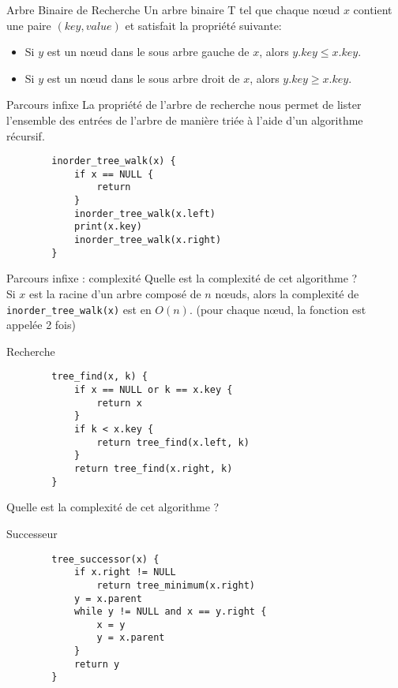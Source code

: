 \documentclass{beamer}
\begin{document}
\begin{frame}[t]{Arbre Binaire de Recherche}
Un arbre binaire T tel que chaque nœud $x$ contient une paire $(key, value)$ et satisfait la
propriété suivante:
\begin{itemize}
    \item Si $y$ est un nœud dans le sous arbre gauche de $x$, alors $y.key \leqslant x.key$.
    \item Si $y$ est un nœud dans le sous arbre droit de $x$, alors $y.key \geqslant x.key$.
\end{itemize}
\end{frame}

\begin{frame}[fragile]{Parcours infixe}
La propriété de l'arbre de recherche nous permet de lister l'ensemble des entrées de l'arbre de
manière triée à l'aide d'un algorithme récursif.
\pause
\begin{lstlisting}
        inorder_tree_walk(x) {
            if x == NULL {
                return
            }
            inorder_tree_walk(x.left)
            print(x.key)
            inorder_tree_walk(x.right)
        }
\end{lstlisting}
\end{frame}

\begin{frame}[fragile]{Parcours infixe : complexité}
    Quelle est la complexité de cet algorithme ?\\
    \pause
    \vfill
    Si $x$ est la racine d'un arbre composé de $n$ nœuds, alors la complexité de
    \texttt{inorder\_tree\_walk(x)} est en $O(n)$. (pour chaque nœud, la fonction est appelée 2 fois)
\end{frame}


\begin{frame}[fragile]{Recherche}
    \pause
    \begin{lstlisting}
        tree_find(x, k) {
            if x == NULL or k == x.key {
                return x
            }
            if k < x.key {
                return tree_find(x.left, k)
            }
            return tree_find(x.right, k)
        }
    \end{lstlisting}

    Quelle est la complexité de cet algorithme ?
\end{frame}

\begin{frame}[fragile]{Successeur}
    \pause
    \begin{lstlisting}
        tree_successor(x) {
            if x.right != NULL
                return tree_minimum(x.right)
            y = x.parent
            while y != NULL and x == y.right {
                x = y
                y = x.parent
            }
            return y
        }
    \end{lstlisting}
\end{frame}
\end{document}
